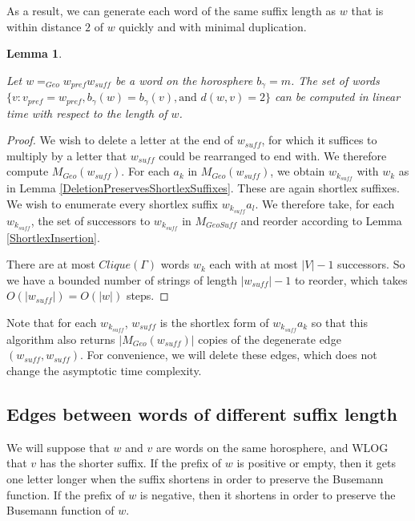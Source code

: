 \documentclass[10pt,a4paper]{amsart}
\newtheorem{lemma}[theorem]{Lemma}
\theoremstyle{definition}
\theoremstyle{remark}
\begin{document}
	As a result, we can generate each word of the same suffix length as $w$ that is within distance $2$ of $w$ quickly and with minimal duplication.
	
	\begin{lemma} \label{RipsEdgesSameSuffixLength}
		
		Let $w=_{Geo}w_{pref}w_{suff}$ be a word on the horosphere $b_\gamma=m$. The set of words $\{v: v_{pref}=w_{pref}, b_\gamma (w)=b_\gamma(v), \text{and } d(w,v)=2\}$ can be computed in linear time with respect to the length of $w$.
		
	\end{lemma}
	
	
	\begin{proof}
		
		We wish to delete a letter at the end of $w_{suff}$, for which it suffices to multiply by a letter that $w_{suff}$ could be rearranged to end with. We therefore compute $M_{Geo}(w_{suff})$. For each $a_k$ in $M_{Geo}(w_{suff})$, we obtain $w_{k_{suff}}$ with $w_k$ as in Lemma \ref{DeletionPreservesShortlexSuffixes}. These are again shortlex suffixes. We wish to enumerate every shortlex suffix $w_{k_{suff}}a_l$. We therefore take, for each $w_{k_{suff}}$, the set of successors to $w_{k_{suff}}$ in $M_{GeoSuff}$ and reorder according to Lemma \ref{ShortlexInsertion}.
		
		There are at most $Clique(\Gamma)$ words $w_k$ each with at most $|V|-1$ successors. So we have a bounded number of strings of length $|w_{suff}|-1$ to reorder, which takes $O(|w_{suff}|)=O(|w|)$ steps. 
	\end{proof}
	
	Note that for each $w_{k_{suff}}$, $w_{suff}$ is the shortlex form of $w_{k_{suff}}a_k$ so that this algorithm also returns $|M_{Geo}(w_{suff})|$ copies of the degenerate edge $(w_{suff}, w_{suff})$. For convenience, we will delete these edges, which does not change the asymptotic time complexity.
	
	\subsection{Edges between words of different suffix length}
	\label{subsec:RipsEdgesDifferentLength}
	
	We will suppose that $w$ and $v$ are words on the same horosphere, and WLOG that $v$ has the shorter suffix. If the prefix of $w$ is positive or empty, then it gets one letter longer when the suffix shortens in order to preserve the Busemann function. If the prefix of $w$ is negative, then it shortens in order to preserve the Busemann function of $w$.
	
\end{document}
